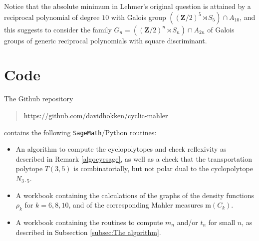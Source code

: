 \documentclass[12pt,reqno]{amsart}
\theoremstyle{definition}
\theoremstyle{plain}
\theoremstyle{definition}
\newcommand{\Z}{\mathbf{Z}}
\newcommand\m{\mathrm{m}}
\begin{document}
\begin{enumerate}
Notice that the absolute minimum in Lehmer's original question is attained by a reciprocal polynomial of degree $10$ with Galois group $((\Z/2)^5 \rtimes S_5) \cap A_{10}$, and this suggests to consider the family $G_n = ((\Z/2)^n \rtimes S_n) \cap A_{2n}$ of Galois groups of generic reciprocal polynomials with square discriminant.  
\end{enumerate}

\bigskip

\section{Code}
\label{sec:code}

The Github repository 
\begin{quote} 
\url{https://github.com/davidhokken/cyclic-mahler} 
\end{quote} 
contains the following \texttt{SageMath}/Python routines: 
\begin{itemize} 
\item An algorithm to compute the cyclopolytopes and check reflexivity as described in Remark \ref{algocycsage}, as well as a check that the transportation polytope $T(3,5)$ is combinatorially, but not polar dual to the cyclopolytope $N_{3 \cdot 5}$. 
\item A workbook containing the calculations of the graphs of the density functions $\rho_k$ for $k=6,8,10$, and of the corresponding Mahler measures $\m(C_k)$. 
\item A workbook containing the routines to compute $m_n$ and/or $t_n$ for small $n$, as described in Subsection \ref{subsec:The algorithm}.
\end{itemize} 
\end{document}
